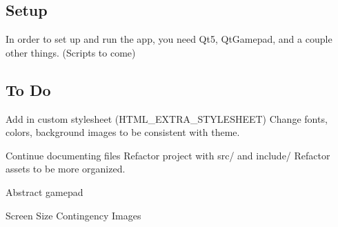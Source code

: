 \subsection*{Setup}

In order to set up and run the app, you need Qt5, Qt\+Gamepad, and a couple other things. (Scripts to come)

\subsection*{To Do}

Add in custom stylesheet (H\+T\+M\+L\+\_\+\+E\+X\+T\+R\+A\+\_\+\+S\+T\+Y\+L\+E\+S\+H\+E\+ET) Change fonts, colors, background images to be consistent with theme.

Continue documenting files Refactor project with src/ and include/ Refactor assets to be more organized.

Abstract gamepad

Screen Size Contingency Images 
